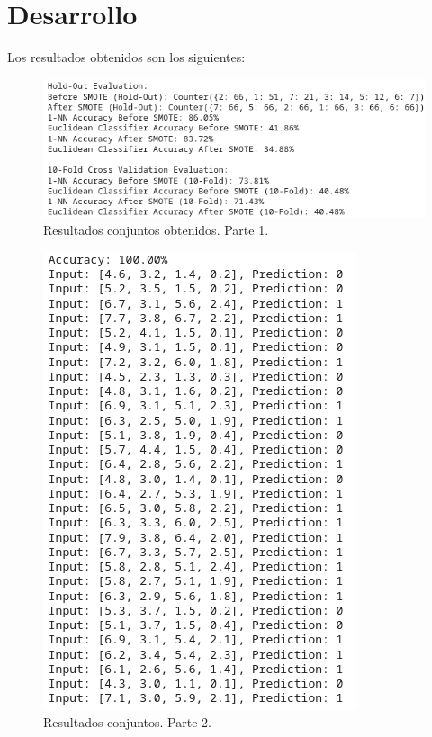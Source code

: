 \documentclass{article}
\begin{document}
   
    \section{Desarrollo}
    
    Los resultados obtenidos son los siguientes: 

    \begin{figure}[!ht]
        \centering
        \includegraphics[scale=0.8]{Resultados_1.png}
        \caption{Resultados conjuntos obtenidos. Parte 1.}
    \end{figure}
    \newpage
    
    \begin{figure}[!ht]
        \centering
        \includegraphics[scale=0.6]{Resultados_2.png}
        \caption{Resultados conjuntos. Parte 2.}
    \end{figure}
    
    
    
\end{document}
